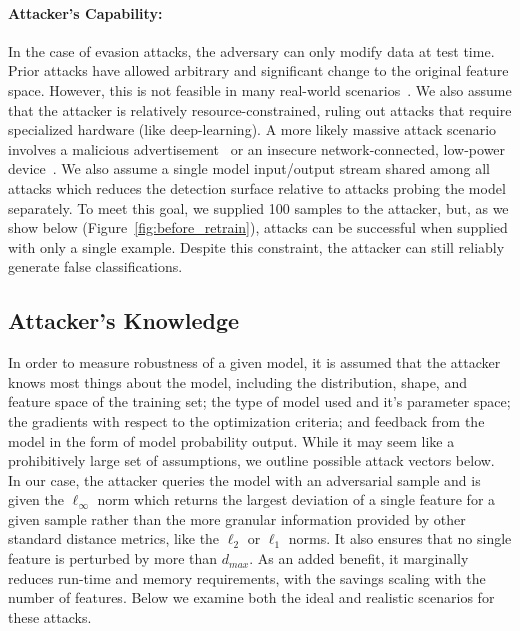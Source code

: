 \documentclass[fonts]{icst}
\begin{document}
\paragraph{Attacker's Capability: }


In the case of evasion attacks, the adversary can only modify data at test time.
Prior attacks have allowed arbitrary and significant change to the original feature space.
However, this is not feasible in many real-world scenarios~\cite{biggio2013evasion}.
We also assume that the attacker is relatively resource-constrained, ruling out attacks that require specialized hardware (like deep-learning).
A more likely massive attack scenario involves a malicious advertisement~\cite{liu_2020} or an insecure network-connected, low-power device~\cite{meidan_2018}.
We also assume a single model input/output stream shared among all attacks which reduces the detection surface relative to attacks probing the model separately.
To meet this goal, we supplied 100 samples to the attacker, but, as we show below (Figure~\ref{fig:before_retrain}), attacks can be successful when supplied with only a single example.
Despite this constraint, the attacker can still reliably generate false classifications.

\subsection{Attacker's Knowledge}

In order to measure robustness of a given model, it is assumed that the attacker knows most things about the model, including the distribution, shape, and feature space of the training set; the type of model used and it's parameter space; the gradients with respect to the optimization criteria; and feedback from the model in the form of model probability output.
While it may seem like a prohibitively large set of assumptions, we outline possible attack vectors below.
In our case, the attacker queries the model with an adversarial sample and is given the $\ell_{\infty}$ norm which returns the largest deviation of a single feature for a given sample rather than the more granular information provided by other standard distance metrics, like the $\ell_2$ or $\ell_1$ norms.
It also ensures that no single feature is perturbed by more than $d_{max}$.
As an added benefit, it marginally reduces run-time and memory requirements, with the savings scaling with the number of features.
Below we examine both the ideal and realistic scenarios for these attacks.
\end{document}

